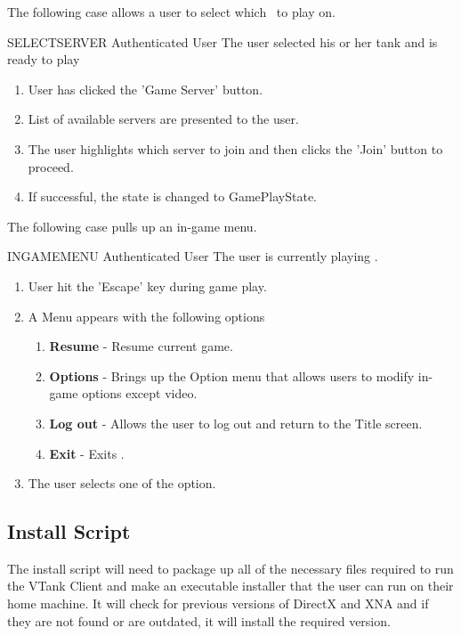 The following case allows a user to select which \GameServer\ to play on.

\begin{usecase}
	{SELECTSERVER}
	{Authenticated User}
	{The user selected his or her tank and is ready to play}
\begin{enumerate}
\item User has clicked the 'Game Server' button.
\item List of available servers are presented to the user.
\item The user highlights which server to join and then clicks the 'Join' button to proceed.
\item If successful, the state is changed to GamePlayState.
\end{enumerate}
\end{usecase}

The following case pulls up an in-game menu.

\begin{usecase}
	{INGAMEMENU}
	{Authenticated User}
	{The user is currently playing \Client.}
\begin{enumerate}
\item User hit the 'Escape' key during game play.
\item A Menu appears with the following options
	\begin{enumerate}
	\item \textbf{Resume} - Resume current game.
	\item \textbf{Options} - Brings up the Option menu that allows users to modify in-game options except video.
	\item \textbf{Log out} - Allows the user to log out and return to the Title screen.
	\item \textbf{Exit} - Exits \Client.
	\end{enumerate}
\item The user selects one of the option.
\end{enumerate}
\end{usecase}

\subsection{Install Script}

The install script will need to package up all of the necessary files required to run the VTank Client and make an executable installer that the user can run on their home machine. It will check for previous versions of DirectX and XNA and if they are not found or are outdated, it will install the required version. 


